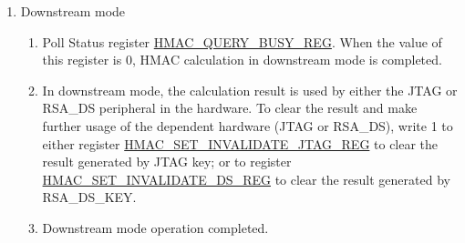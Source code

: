 \documentclass[main\_\_EN.tex]{subfiles}
\begin{document}
\begin{enumerate}
    \item Downstream mode
    \begin{enumerate}
        \item Poll Status register \hyperref[regdesc:HMACQUERYBUSYREG]{HMAC\_QUERY\_BUSY\_REG}. When the value of this register is 0, HMAC calculation in downstream mode is completed.
        \item In downstream mode, the calculation result is used by either the JTAG or RSA\_DS peripheral in the hardware.
        To clear the result and make further usage of the dependent hardware (JTAG or RSA\_DS), write 1 to either register \hyperref[regdesc:HMACSETINVALIDATEJTAGREG]{HMAC\_SET\_INVALIDATE\_JTAG\_REG} to clear the result generated by JTAG key; or to register \hyperref[regdesc:HMACSETINVALIDATEDSREG]{HMAC\_SET\_INVALIDATE\_DS\_REG} to clear the result generated by RSA\_DS\_KEY.
        \item Downstream mode operation completed.
    \end{enumerate}


\end{enumerate}
\end{document}

